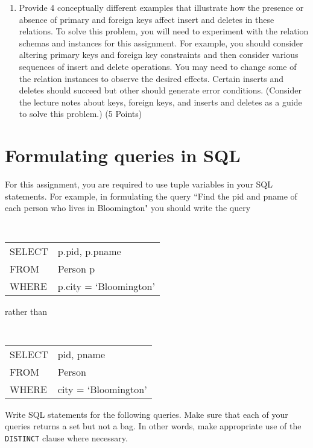 \documentclass{article}
\begin{document}
\begin{enumerate}
\item Provide 4 conceptually different examples that illustrate how the
presence or absence of primary and foreign keys affect insert and
deletes in these relations.  To solve this problem, you will need to
experiment with the relation schemas and instances for this
assignment.  For example, you should consider altering primary keys
and foreign key constraints and then consider various sequences of
insert and delete operations.  You may need to change some of the
relation instances to observe the desired effects.  Certain inserts
and deletes should succeed but other should generate error
conditions.  (Consider the lecture notes about keys, foreign keys,
and inserts and deletes as a guide to solve this problem.) (5 Points)
  \end{enumerate}
 \newpage
  \section{Formulating queries in SQL}\label{SQLQueries}

For this assignment,  you are required to 
use  tuple variables in your SQL statements.   
For example, in formulating the query ``Find the pid and pname of each person who lives in Bloomington" you should write the query

\begin{center}{\tt
\begin{tabular}{ll}
SELECT &p.pid, p.pname\\
FROM & Person p\\
WHERE & p.city = `Bloomington'
\end{tabular}}
\end{center}
rather than
\begin{center}{\tt
\begin{tabular}{ll}
SELECT &pid, pname\\
FROM & Person\\
WHERE & city = `Bloomington' 
\end{tabular}}
\end{center}

Write SQL statements for the following queries.   
Make sure that each of your queries returns a set but not a bag.  In other words, make appropriate use of the
{\tt DISTINCT} clause where necessary.
\end{document}
